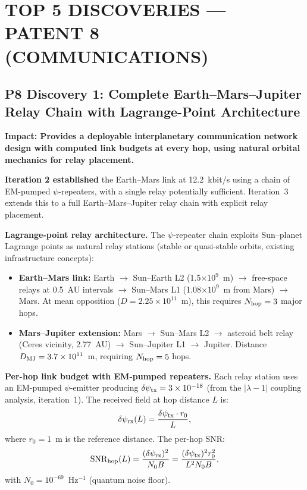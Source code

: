 \documentclass[aps,prd,twocolumn,superscriptaddress,nofootinbib]{revtex4-2}
\newcommand{\SNR}{\mathrm{SNR}}
\begin{document}
\maketitle

\section{TOP 5 DISCOVERIES --- PATENT 8 (COMMUNICATIONS)}
\label{sec:top5-p8}

\subsection{P8 Discovery 1: Complete Earth--Mars--Jupiter Relay Chain
with Lagrange-Point Architecture}

\textbf{Impact: Provides a deployable interplanetary communication
network design with computed link budgets at every hop, using
natural orbital mechanics for relay placement.}

\textbf{Iteration 2 established} the Earth--Mars link at 12.2~kbit/s
using a chain of EM-pumped $\psi$-repeaters, with a single relay
potentially sufficient.  Iteration~3 extends this to a full
Earth--Mars--Jupiter relay chain with explicit relay placement.

\textbf{Lagrange-point relay architecture.}
The $\psi$-repeater chain exploits Sun--planet Lagrange points as
natural relay stations (stable or quasi-stable orbits, existing
infrastructure concepts):

\begin{itemize}
\item \textbf{Earth--Mars link:} Earth $\to$ Sun--Earth L2
(1.5$\times10^9$~m) $\to$ free-space relays at 0.5~AU intervals
$\to$ Sun--Mars L1 (1.08$\times10^9$~m from Mars) $\to$ Mars.
At mean opposition ($D = 2.25\times10^{11}$~m), this requires
$N_{\rm hop} = 3$ major hops.

\item \textbf{Mars--Jupiter extension:} Mars $\to$ Sun--Mars L2
$\to$ asteroid belt relay (Ceres vicinity, 2.77~AU) $\to$
Sun--Jupiter L1 $\to$ Jupiter. Distance $D_{\rm MJ} =
3.7\times10^{11}$~m, requiring $N_{\rm hop} = 5$ hops.
\end{itemize}

\textbf{Per-hop link budget with EM-pumped repeaters.}
Each relay station uses an EM-pumped $\psi$-emitter producing
$\delta\psi_{\rm tx} = 3\times10^{-18}$ (from the $|\lambda-1|$
coupling analysis, iteration~1).  The received field at hop
distance $L$ is:
\begin{equation}
\delta\psi_{\rm rx}(L) = \frac{\delta\psi_{\rm tx} \cdot r_0}{L},
\label{eq:hop-field}
\end{equation}
where $r_0 = 1$~m is the reference distance.  The per-hop SNR:
\begin{equation}
\SNR_{\rm hop}(L) = \frac{(\delta\psi_{\rm rx})^2}{N_0 B}
= \frac{(\delta\psi_{\rm tx})^2 r_0^2}{L^2 N_0 B},
\label{eq:hop-snr-general}
\end{equation}
with $N_0 = 10^{-69}$~Hz$^{-1}$ (quantum noise floor).
\end{document}
